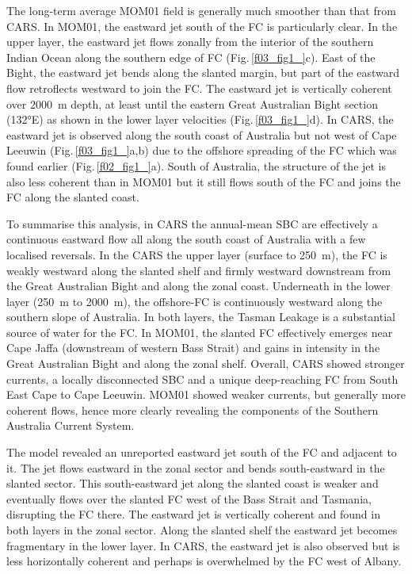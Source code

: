 \documentclass[preprint,3p,review,12pt]{elsarticle}
\begin{document}
The long-term average MOM01 field is generally much smoother than that from CARS\@. In MOM01, the eastward jet south of the FC is particularly clear.
In the upper layer, the eastward jet flows zonally from the interior of the southern Indian Ocean along the southern edge of FC (Fig.\,\ref{f03_fig1_}c). East of the Bight, the eastward jet bends along the slanted margin, but part of the eastward flow retroflects westward to join the FC\@.
The eastward jet is vertically coherent over \SI{2000}{\meter} depth, at least until the eastern Great Australian Bight section (\ang{132}E) as shown in the lower layer velocities (Fig.\,\ref{f03_fig1_}d). In CARS, the eastward jet is observed along the south coast of Australia but not west of Cape Leeuwin (Fig.\,\ref{f03_fig1_}a,b) due to the offshore spreading of the FC
which was found earlier (Fig.\,\ref{f02_fig1_}a). South of Australia, the structure of the jet is also
less coherent
than in MOM01
but it still flows south of the FC and
joins the FC along the slanted coast.

To summarise this analysis, in CARS the annual-mean SBC are effectively a continuous eastward flow all along the south coast of Australia with a few localised reversals.
In the CARS the upper layer (surface to \SI{250}{\meter}), the FC is weakly westward along the slanted shelf and firmly westward downstream from the Great Australian Bight and along the zonal coast. Underneath in the lower layer (\SI{250}{\meter} to \SI{2000}{\meter}), the offshore-FC is continuously westward along the southern slope of Australia. In both layers, the Tasman Leakage is
a substantial source of water for the FC\@.
In MOM01, the slanted FC effectively emerges near Cape Jaffa (downstream of western Bass Strait) and gains in intensity in the Great Australian Bight and along the zonal shelf. Overall, CARS showed stronger currents, a locally disconnected SBC and a unique deep-reaching FC from South East Cape to Cape Leeuwin. MOM01 showed weaker currents, but generally more coherent flows,
hence more clearly revealing the
components of the Southern Australia Current System. 

The model revealed an unreported eastward jet south of the FC and adjacent to it. The jet flows eastward in the zonal sector and bends south-eastward in the slanted sector. This south-eastward jet along the slanted coast is weaker and eventually flows over the slanted FC west of the Bass Strait and Tasmania, disrupting the FC there.
The eastward jet is vertically coherent and found
in both layers in the zonal sector. Along the slanted shelf the eastward jet becomes fragmentary in the lower layer.
In CARS, the eastward jet is also observed but is less horizontally coherent and perhaps is overwhelmed by the FC west of Albany.
\end{document}
